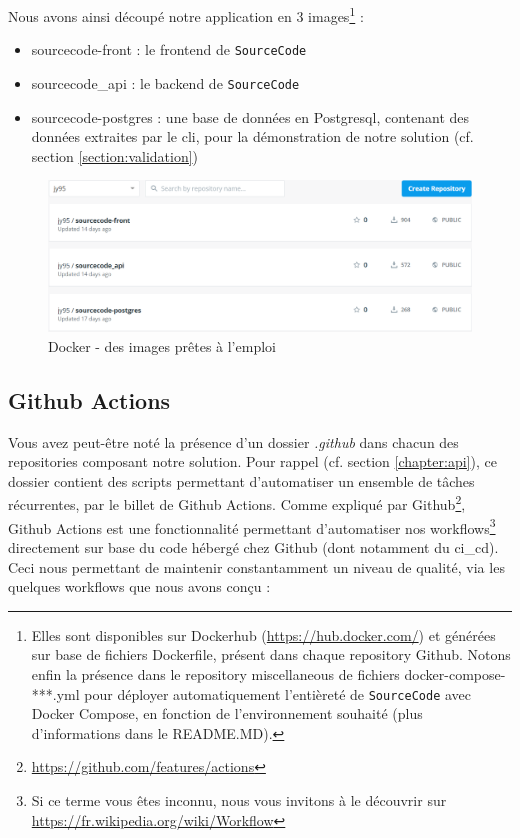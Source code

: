 Nous avons ainsi découpé notre application en 3 images\footnote{
    Elles sont disponibles sur Dockerhub (\url{https://hub.docker.com/}) 
    et générées sur base de fichiers Dockerfile, présent dans chaque repository Github.
    Notons enfin la présence dans le repository miscellaneous de fichiers docker-compose-***.yml pour déployer automatiquement l'entièreté de \texttt{SourceCode} avec Docker Compose, en fonction de l'environnement souhaité (plus d'informations dans le README.MD).
} :

\begin{itemize}[nosep,noitemsep,topsep=0pt,partopsep=0pt,after=\vspace*{2pt}]
    \item sourcecode-front : le \gls{frontend} de \texttt{SourceCode}
    \item sourcecode\_api : le \gls{backend} de \texttt{SourceCode}
    \item sourcecode-postgres : une base de données en Postgresql, contenant des données extraites par le \Gls{cli}, pour la démonstration de notre solution (cf. section \ref{section:validation})
\end{itemize}

\begin{figure}[H]
    \includegraphics[width=\textwidth,height=0.13\textheight]{images/serveur/dockerHub.PNG}
    \centering
    \caption{Docker - des images prêtes à l'emploi}
    \label{fig:dockerImages}
\end{figure}

\pagebreak
\subsection{Github Actions}
\label{section:GithubActions}

Vous avez peut-être noté la présence d'un dossier \textit{.github} dans chacun des repositories composant notre solution.
Pour rappel (cf. section \ref{chapter:api}), ce dossier contient des scripts permettant d'automatiser un ensemble de tâches récurrentes, par le billet de Github Actions.
Comme expliqué par Github\footnote{
    \url{https://github.com/features/actions}
}, Github Actions est une fonctionnalité permettant d'automatiser nos workflows\footnote{
    Si ce terme vous êtes inconnu, nous vous invitons à le découvrir sur \url{https://fr.wikipedia.org/wiki/Workflow}
}  
directement sur base du code hébergé chez Github (dont notamment du \gls{ci_cd}).
Ceci nous permettant de maintenir constantamment un niveau de qualité, via les quelques workflows que nous avons conçu :

